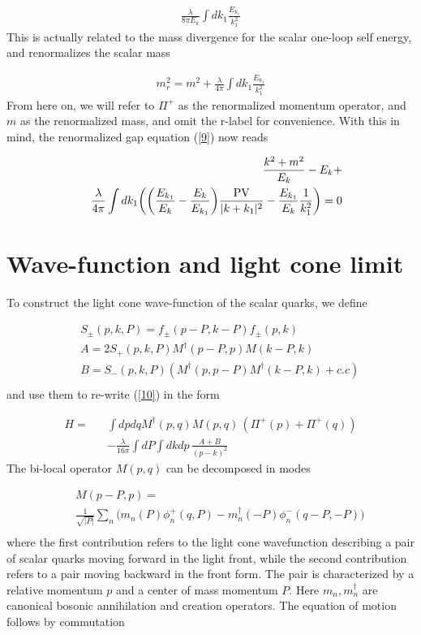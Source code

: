 \documentclass[showpacs,twocolumn,aps,preprintnumbers,letterpaper]{revtex4}
\newcommand{\be}{\begin{equation}}
\newcommand{\ee}{\end{equation}}
\def\be{\begin{eqnarray}}
\def\ee{\end{eqnarray}}
\begin{document}
\be
\label{R3}
\frac{\lambda}{8\pi E_k} \int dk_1 \frac{E_{k_1}}{k_1^2}
\ee
This is actually related to the mass divergence for the scalar one-loop self energy,  and renormalizes  the scalar mass

\be
\label{R4}
m_r^2=m^2+\frac{\lambda}{4\pi } \int dk_1 \frac{E_{k_1}}{k_1^2}
\ee
From here on, we will refer to $\Pi^+$ as the renormalized momentum operator, and $m$ as the renormalized mass,
 and omit the r-label for convenience.  With this in  mind, the renormalized gap equation (\ref{9}) now reads

\be
\label{R5}
&&\frac{k^2+m^2}{E_k}-E_k+\nonumber \\ 
&&\frac{\lambda}{4\pi}\int dk_1\bigg(\bigg(\frac{E_{k_1}}{E_{k}}-\frac{E_{k}}{E_{k_1}}\bigg)\frac{{\rm PV}}{|k+k_1|^2}- \frac{E_{k_1}}{E_k}\frac 1{k_1^2}\bigg)=0\nonumber \\
\ee





\section{Wave-function and light cone limit}

To construct the light cone wave-function of the scalar quarks, we define

\be
\label{11}
&&S_{\pm}(p,k,P)=f_{\pm}(p-P,k-P)f_{\pm}(p,k)\nonumber\\
&&A=2S_{+}(p,k,P)M^{\dagger}(p-P,p)M(k-P,k)\nonumber\\
&&B=S_{-}(p,k,P)(M^{\dagger}(p,p-P)M^{\dagger}(k-P,k)+c.c)\nonumber\\
\ee
and use them  to re-write (\ref{10}) in the form

\be
\label{12}
H=&&\int dpdqM^{\dagger}(p,q)M(p,q)\,(\Pi^{+}(p)+\Pi^{+}(q))\nonumber \\
&&-\frac{\lambda}{16\pi}\int dP \int {dkdp}\,\frac {A+B}{(p-k)^2}
\ee
The bi-local operator $M(p,q)$ can be decomposed in modes 


\be
\label{13}
&&M(p-P,p)=\nonumber \\ 
&&\frac{1}{\sqrt{|P|}}\sum_{n}\bigg(m_n(P)\phi_{n}^{+}(q,P)-m_{n}^{\dagger}(-P)\phi_n^{-}(q-P,-P)\bigg)\nonumber\\
\ee
where the first contribution refers to the light cone wavefunction describing a pair of scalar quarks
moving forward in the light front, while the second contribution refers to a pair moving backward in the
front form. The pair is characterized by a relative momentum $p$ and a center of mass momentum $P$. 
Here $m_n, m_n^\dagger$ are canonical bosonic annihilation and creation operators. The
equation of motion follows by commutation
\end{document}
